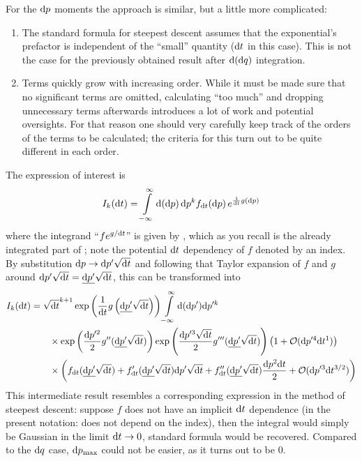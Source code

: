 For the \(\mathrm{d} p\) moments the approach is similar, but a little more complicated:
%
\begin{enumerate}
	\item The standard formula for steepest descent assumes that the exponential's prefactor is independent of the ``small'' quantity (\(\mathrm{d} t\) in this case). This is not the case for the previously obtained result after \(\mathrm{d}(\mathrm{d} q)\) integration.
	\item Terms quickly grow with increasing order. While it must be made sure that no significant terms are omitted, calculating ``too much'' and dropping unnecessary terms afterwards introduces a lot of work and potential oversights. For that reason one should very carefully keep track of the orders of the terms to be calculated; the criteria for this turn out to be quite different in each order.
\end{enumerate}
%
The expression of interest is
\begin{align}
	\label{eqn:dp-moments-integral}
	I_k(\mathrm{d} t) = \int\limits_{-\infty}^\infty \mathrm{d} (\mathrm{d} p) \, \mathrm{d} p^k f_{\mathrm{d} t}(\mathrm{d} p) \, e^{\frac1{\mathrm{d} t}g(\mathrm{d} p)}
\end{align}
where the integrand ``\(fe^{g/\mathrm{d} t}\)'' is given by , which as you recall is the already integrated part of ; note the potential \(\mathrm{d} t\) dependency of \(f\) denoted by an index. By substitution \(\mathrm{d} p\rightarrow \mathrm{d} p'\sqrt{\mathrm{d} t}\) and following that Taylor expansion of \(f\) and \(g\) around \(\mathrm{d} p'\sqrt{\mathrm{d} t} = \underline{\mathrm{d} p'}\sqrt{\mathrm{d} t}\), this can be transformed into
\begin{align}
	\label{eqn:I_k(dt)}
	I_k(\mathrm{d} t) &=
		\sqrt{\mathrm{d} t}^{k+1}
		\operatorname{exp}\left(\frac1{\mathrm{d} t}g\left(\underline{\mathrm{d} p'}\sqrt{\mathrm{d} t}\right)\right)
		\int\limits_{-\infty}^\infty \mathrm{d} (\mathrm{d} p') \mathrm{d} p'^k
		\\ &\qquad \notag \times
		\operatorname{exp}\left(\frac{\mathrm{d} p'^2}2 g''(\underline{\mathrm{d} p'}\sqrt{\mathrm{d} t})\right)
		\operatorname{exp}\left(\frac{\mathrm{d} p'^3\sqrt{\mathrm{d} t}}2 g'''(\underline{\mathrm{d} p'}\sqrt{\mathrm{d} t})\right)
		\left(1 + \mathcal{O}(\mathrm{d} p'^4 \mathrm{d} t^1)\right)
		\\ &\qquad \notag \times
		\left(
			f_{\mathrm{d} t}(\underline{\mathrm{d} p'}\sqrt{\mathrm{d} t})
			+ f_{\mathrm{d} t}'(\underline{\mathrm{d} p'}\sqrt{\mathrm{d} t})\mathrm{d} p'\sqrt{\mathrm{d} t}
			+ f_{\mathrm{d} t}''(\underline{\mathrm{d} p'}\sqrt{\mathrm{d} t})\frac{\mathrm{d} p^2\mathrm{d} t}2
			+ \mathcal{O}(\mathrm{d} p'^3\mathrm{d} t^{3/2})
		\right)
\end{align}
This intermediate result resembles a corresponding expression in the method of steepest descent: suppose \(f\) does not have an implicit \(\mathrm{d} t\) dependence (in the present notation: does not depend on the index), then the integral would simply be Gaussian in the limit \(\mathrm{d} t\to0\), standard formula  would be recovered. Compared to the \(\mathrm{d} q\) case, \(\mathrm{d} p_\text{max}\) could not be easier, as it turns out to be \(0\).

